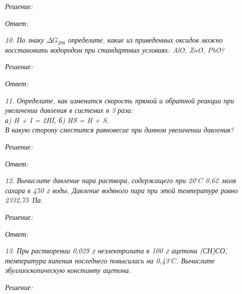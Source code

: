 \vspace*{2em}
\emph{Решение:}

\vspace*{2em}
\emph{Ответ: }

\newpage %

\emph{10. По знаку \( \Delta G_{298} \) определите, какие из приведенных
оксидов можно восстановить водородом при стандартных условиях:
Al\.O, Zn\.O, Pb\.O?}

\vspace*{2em}
\emph{Решение:}

\vspace*{2em}
\emph{Ответ: }

\newpage %

\emph{11. Определите, как изменится скорость прямой и обратной реакции при
увеличении давления в системах в 3 раза:\\
а) H + I = 2H\.I, \qquad
б) H\.S = H + S.\\
В какую сторону сместится равновесие при данном увеличении давления?}

\vspace*{2em}
\emph{Решение:}

\vspace*{2em}
\emph{Ответ: }

\newpage %

\emph{12. Вычислите давление пара раствора, содержащего при 20\( ^\circ C \)
0,62~моля сахара в 450~г воды. Давление водяного пара при этой температуре
равно 2332,75~Па.}

\vspace*{2em}
\emph{Решение:}

\vspace*{2em}
\emph{Ответ: }

\newpage %

\emph{13. При растворении 0,029~г неэлектролита в 100~г ацетона
(С\.Н)\.С\.О, температура кипения последнего повысилась на
0,43\( ^\circ C \). Вычислите эбуллиоскопическую константу ацетона.}

\vspace*{2em}
\emph{Решение:}

